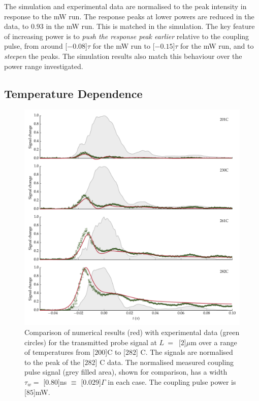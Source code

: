     The simulation and experimental data are normalised to the peak intensity in
    response to the \unit[100]{mW} run. The response peaks at lower powers are
    reduced in the data, to $0.93$ in the \unit[20]{mW} run. This is matched in
    the simulation. The key feature of increasing power is to \textit{push the
    response peak earlier} relative to the coupling pulse, from around
    \unit[$-0.08$]{$\tau$} for the \unit[20]{mW} run to \unit[$-0.15$]{$\tau$}
    for the \unit[100]{mW} run, and to \textit{steepen} the peaks. The
    simulation results also match this behaviour over the power range
    investigated.

  \subsection{Temperature Dependence}

    \begin{figure}[p]
    \includegraphics[width=\linewidth]{figs/06_simultons/mb_vee2g_exp_plot_temp_282_fig1.pdf}
    \caption{
    Comparison of numerical results (red) with experimental data (green circles)
    for the transmitted probe signal at $L~=$~\unit[$2$]{$\mu$m} over a range of
    temperatures from \unit[$200$]{\textdegree C} to \unit[$282$]{\textdegree
    C}. The signals are normalised to the peak of the \unit[$282$]{\textdegree
    C} data. The normalised measured coupling pulse signal (grey filled area),
    shown for comparison, has a width $\tau_w = $ \unit[$0.80$]{ns} $ \equiv $
    \unit[$0.029$]{$\Gamma$} in each case. The coupling pulse power is
    \unit[$85$]{mW}.
    } 
    \label{fig:exp_result_temp_dep} 
    \end{figure}

